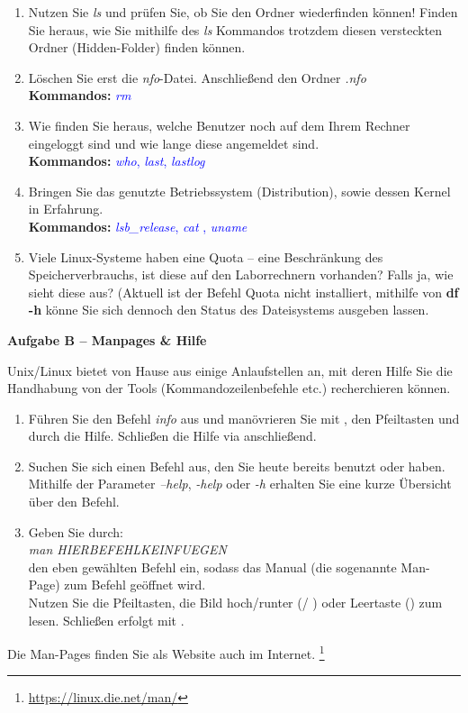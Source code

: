 \documentclass[paper=a4,fontsize=11pt]{scrartcl}%
\numberwithin{equation}{section}
\begin{document}
\begin{enumerate}
\begin{enumerate} [label=(\alph*)]
          \item Nutzen Sie \emph{ls} und prüfen Sie, ob Sie den Ordner wiederfinden können! Finden Sie heraus, wie Sie mithilfe des \emph{ls} Kommandos trotzdem diesen versteckten Ordner (Hidden-Folder) finden können.
          \item Löschen Sie erst die \emph{nfo}-Datei. Anschließend den Ordner \emph{.nfo}\\
          \textbf{Kommandos:} \textcolor{blue}{\emph{rm}}
          \item Wie finden Sie heraus, welche Benutzer noch auf dem Ihrem Rechner eingeloggt sind und wie lange diese angemeldet sind.\\
          \textbf{Kommandos:} \textcolor{blue}{\emph{who}, \emph{last}, \emph{lastlog}}
          \item Bringen Sie das genutzte Betriebssystem (Distribution), sowie dessen Kernel in Erfahrung.\\
          \textbf{Kommandos:} \textcolor{blue}{\emph{lsb\_release}, \emph{cat }, \emph{uname}}
          \item Viele Linux-Systeme haben eine Quota -- eine Beschränkung des Speicherverbrauchs, ist diese auf den Laborrechnern vorhanden? Falls ja, wie sieht diese aus? (Aktuell ist der Befehl Quota nicht installiert, mithilfe von \textbf{df -h} könne Sie sich dennoch den Status des Dateisystems ausgeben lassen.
        \end{enumerate}
\end{enumerate}

\begin{center}\Large{\textbf{Aufgabe B -- Manpages \& Hilfe}}\end{center}\vskip0.25in
Unix/Linux bietet von Hause aus einige Anlaufstellen an, mit deren Hilfe Sie die Handhabung von der Tools (Kommandozeilenbefehle etc.) recherchieren können.
\begin{enumerate}
	\item Führen Sie den Befehl \emph{info} aus und manövrieren Sie mit \keys{\tab}, den Pfeiltasten und \keys{\return} durch die Hilfe. Schließen die Hilfe via  anschließend.
	\item Suchen Sie sich einen Befehl aus, den Sie heute bereits benutzt oder haben. Mithilfe der Parameter \emph{--help}, \emph{-help} oder \emph{-h} erhalten Sie eine kurze Übersicht über den Befehl.
    \item Geben Sie durch: \\
    		\emph{man HIERBEFEHLKEINFUEGEN}\\
		den eben gewählten Befehl ein, sodass das Manual (die sogenannte Man-Page) zum Befehl geöffnet wird.\\
		 Nutzen Sie die Pfeiltasten, die Bild hoch/runter (/ ) oder Leertaste (\keys{\Space}) zum lesen. Schließen erfolgt mit .
\end{enumerate}
Die Man-Pages finden Sie als Website auch im Internet. \footnote{\url{https://linux.die.net/man/}}
\end{document}
